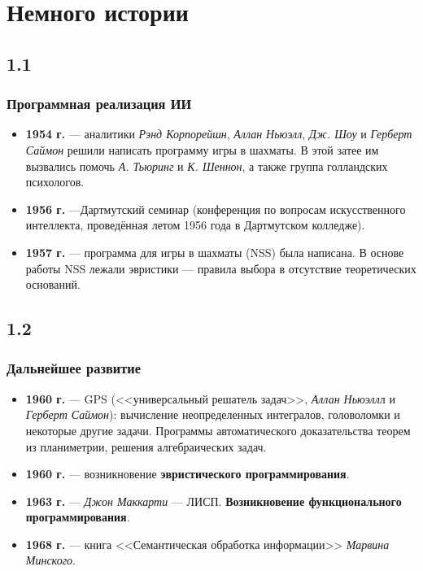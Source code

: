 \documentclass[default]{beamer}
\begin{document}
	\section{Немного истории}
	\subsection{1.1}
	\begin{frame}
		\frametitle{Программная реализация ИИ}

		\begin{itemize}
			\item \textbf{1954 г.} --- аналитики \textit{Рэнд Корпорейшн}, \textit{Аллан Ньюэлл}, \textit{Дж. Шоу} и \textit{Герберт Саймон}  решили написать программу игры в шахматы. В этой затее им вызвались помочь \textit{А. Тьюринг} и \textit{К. Шеннон}, а также группа голландских психологов.
			\item \textbf{1956 г.} ---Дартмутский семинар (конференция по вопросам искусственного интеллекта, проведённая летом 1956 года в Дартмутском колледже).
			\item \textbf{1957 г.} --- программа для игры в шахматы (NSS) была написана. В основе работы NSS лежали эвристики --- правила выбора в отсутствие теоретических оснований.
		\end{itemize}
	\end{frame}
	\subsection{1.2}
	\begin{frame}
	\frametitle{Дальнейшее развитие}
	
		\begin{itemize}
			\item \textbf{1960 г.}  --- GPS (<<универсальный решатель задач>>, \textit{Аллан Ньюэлл}л и \textit{Герберт Саймон}): вычисление неопределенных интегралов, головоломки и  некоторые другие задачи.  Программы автоматического доказательства теорем из планиметрии, решения алгебраических задач. 
			\item \textbf{1960 г.} --- возникновение \textbf{эвристического программирования}. 
			\item \textbf{1963 г.} --- \textit{Джон Маккарти} --- ЛИСП. \textbf{Возникновение функционального программирования}.
			\item \textbf{1968 г.} --- книга <<Семантическая обработка информации>> \textit{Марвина Минского}.
		\end{itemize}
	\end{frame}
\end{document}
